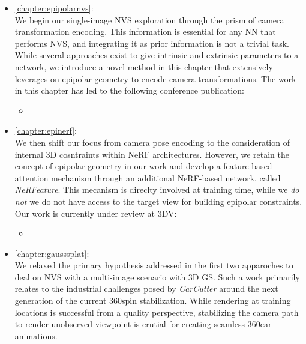 \begin{itemize}
      \item \autoref{chapter:epipolarnvs}: \\
            We begin our single-image \ac{NVS} exploration through the prism of camera transformation encoding. This information is essential for any \ac{NN} that performs \ac{NVS}, and integrating it as prior information is not a trivial task. While several approaches exist to give intrinsic and extrinsic parameters to a network, we introduce a novel method in this chapter that extensively leverages on epipolar geometry to encode camera transformations. The work in this chapter has led to the following conference publication:
            \begin{itemize}
                \item {}
            \end{itemize}


      \item \autoref{chapter:epinerf}: \\
            We then shift our focus from camera pose encoding to the consideration of internal 3D cosntraints within \ac{NeRF} architectures. However, we retain the concept of epipolar geometry in our work and develop a feature-based attention mechanism through an additional \ac{NeRF}-based network, called \textit{NeRFeature}. This mecanism is direclty involved at training time, while we \textit{do not} we do not have access to the target view for building epipolar constraints. Our work is currently under review at 3DV:
            \begin{itemize}
                  \item {}
            \end{itemize}

      \item \autoref{chapter:gausssplat}: \\
            We relaxed the primary hypothesis addressed in the first two apparoches to deal on \ac{NVS} with a multi-image scenario with 3D \ac{GS}. Such a work primarily relates to the industrial challenges posed by \textit{CarCutter} around the next generation of the current 360\degree spin stabilization. While rendering at training locations is successful from a quality perspective, stabilizing the camera path to render unobserved viewpoint is crutial for creating seamless 360\degree car animations. 


\end{itemize}
